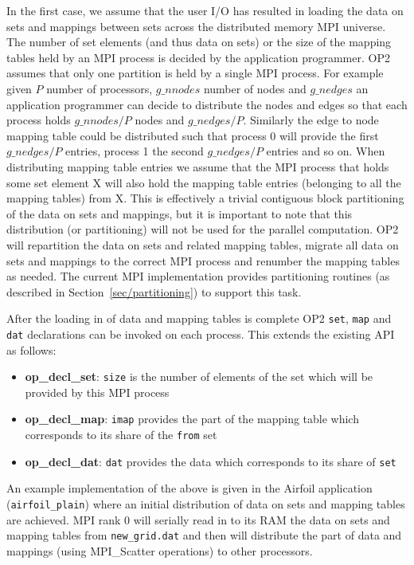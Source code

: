 \documentclass[11pt]{article}
\begin{document}
In the first case, we assume that the user I/O has resulted in loading the data
on sets and mappings between sets across the distributed memory MPI universe.
The number of set elements (and thus data on sets) or the size of the mapping
tables held by an MPI process is decided by the application programmer. OP2
assumes that only one partition is held by a single MPI process. For example
given $P$ number of processors, $g\_nnodes$ number of nodes and $g\_nedges$
an application programmer can decide to distribute the nodes and edges so that
each process holds $g\_nnodes/P$ nodes and $g\_nedges/P$. Similarly the edge to
node mapping table could be distributed such that process 0 will provide the
first $g\_nedges/P$ entries, process 1 the second $g\_nedges/P$ entries and so
on. When distributing mapping table entries we assume that the MPI process that
holds some set element X will also hold the mapping table entries (belonging
to all the mapping tables) from X. This is effectively a trivial contiguous
block partitioning of the data on sets and mappings, but it is important to note
that this distribution (or partitioning) will not be used for the parallel
computation. OP2 will repartition the data on sets and related mapping tables,
migrate all data on sets and mappings to the correct MPI process and renumber
the mapping tables as needed. The current MPI implementation provides
partitioning routines (as described in Section~\ref{sec/partitioning}) to
support this task.

\noindent After the loading in of data and mapping tables is complete OP2
\texttt{set}, \texttt{map} and \texttt{dat} declarations can be invoked on each
process. This extends the existing API as follows:
\begin{itemize}
\item {\bf op\_decl\_set}: {\tt size} is the number of elements of the set which
will be provided by this MPI process

\item {\bf op\_decl\_map}: {\tt imap} provides the part of the mapping table
which corresponds to its share of the {\tt from} set

\item {\bf op\_decl\_dat}: {\tt dat} provides the data which corresponds to its
share of {\tt set}
\end{itemize}
\noindent An example implementation of the above is given in the Airfoil application (\texttt{airfoil\_plain}) where an
initial  distribution of data on sets and mapping tables are achieved. MPI rank 0 will serially read in to its RAM the
data on sets and mapping tables from \texttt{new\_grid.dat} and then will distribute the part of data and mappings
(using MPI\_Scatter operations) to other processors.\\
\end{document}
